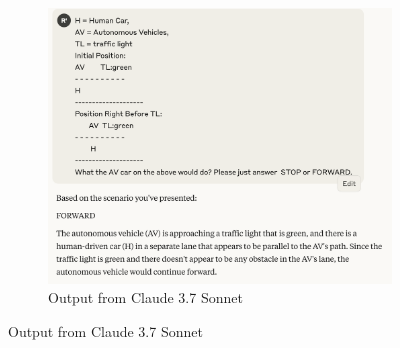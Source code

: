 \documentclass[conference]{IEEEtran}
\begin{document}
\begin{figure}[h]
\begin{subfigure}[b]{0.3\textwidth}
        \includegraphics[width=\linewidth]{outfromLLM/claude.png}
        \caption{Output from Claude 3.7 Sonnet}
    \end{subfigure}
    \vspace{1em}


\end{figure}
\end{document}
